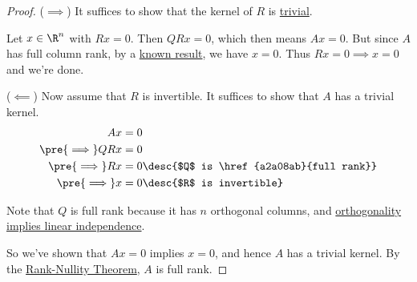 \begin{proof}
  ($\implies$) It suffices to show that the kernel of $R$ is
  \href{f532630}{trivial}.

  Let $x\in\R^n$ with $Rx=0$. Then $QRx=0$, which then means $Ax=0$. But since
  $A$ has full column rank, by a \href{a2a08ab}{known result}, we have $x=0$.
  Thus $Rx=0\implies x=0$ and we're done.

  ($\impliedby$) Now assume that $R$ is invertible. It suffices to show that $A$
  has a trivial kernel.
  \begin{align*}
    Ax                &=0                                        \\
    \pre{\implies}QRx &=0                                        \\
    \pre{\implies}Rx  &=0\desc{$Q$ is \href{a2a08ab}{full rank}} \\
    \pre{\implies}x   &=0\desc{$R$ is invertible}
  \end{align*}

  Note that $Q$ is full rank because it has $n$ orthogonal columns, and
  \href{c0eb6f5}{orthogonality implies linear independence}.

  So we've shown that $Ax=0$ implies $x=0$, and hence $A$ has a trivial kernel.
  By the \href{ee102e4}{Rank-Nullity Theorem}, $A$ is full rank.
\end{proof}
